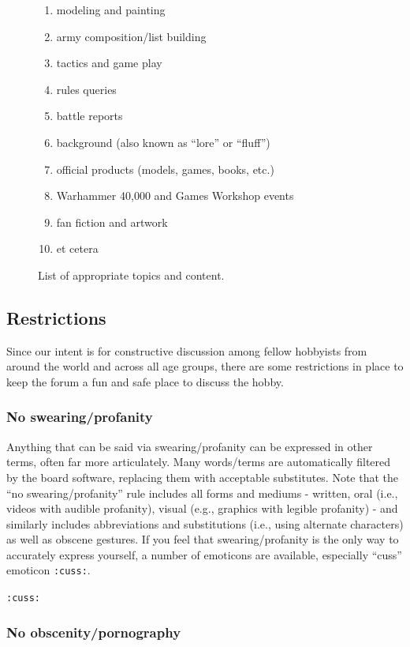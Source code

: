 \documentclass[12pt]{article}
\begin{document}
\begin{figure}[H]
\begin{enumerate}
\item modeling and painting
\item army composition/list building
\item tactics and game play
\item rules queries
\item battle reports
\item background (also known as ``lore'' or ``fluff'')
\item official products (models, games, books, etc.)
\item Warhammer 40,000 and Games Workshop events
\item fan fiction and artwork
\item et cetera
\end{enumerate}
	\caption{List of appropriate topics and content.}
\end{figure}

\subsection{Restrictions}

Since our intent is for constructive discussion among fellow hobbyists 
from around the world and across all age groups, there are some 
restrictions in place to keep the forum a fun and safe place to discuss 
the hobby.

\subsubsection{No swearing/profanity}

Anything that can be said via swearing/profanity can be expressed in 
other terms, often far more articulately. Many words/terms are 
automatically filtered by the board software, replacing them with 
acceptable substitutes. Note that the ``no swearing/profanity'' rule 
includes all forms and mediums - written, oral (i.e., videos with 
audible profanity), visual (e.g., graphics with legible profanity) - 
and similarly includes abbreviations and substitutions (i.e., using 
alternate characters) as well as obscene gestures.
If you feel that swearing/profanity is the only way to accurately 
express yourself, a number of emoticons are available, especially 
``cuss'' emoticon {\texttt{:cuss:}}.

{\texttt{:cuss:}}

\subsubsection{No obscenity/pornography}
\end{document}
